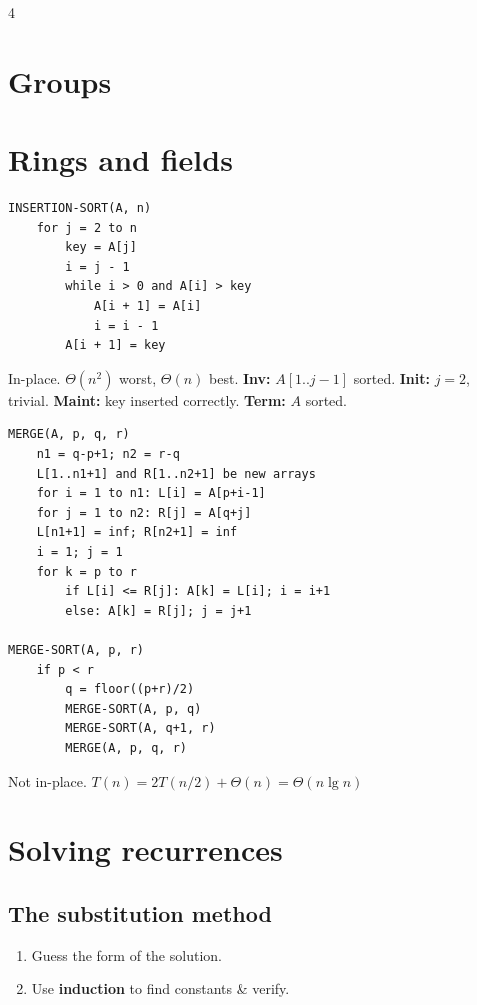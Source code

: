 \documentclass[8pt,a4paper,landscape]{extarticle}
\begin{document}
\begin{multicols*}{4}
\section{Groups}

\section{Rings and fields}

\iffalse
\begin{lstlisting}
INSERTION-SORT(A, n)
    for j = 2 to n
        key = A[j]
        i = j - 1
        while i > 0 and A[i] > key
            A[i + 1] = A[i]
            i = i - 1
        A[i + 1] = key
\end{lstlisting}

\begin{prop}[title=Runtime \& Loop invariant (like induction)]
In-place. $\Theta(n^2)$ worst, $\Theta(n)$ best. \textbf{Inv:} $A[1..j{-}1]$ sorted.
\textbf{Init:} $j{=}2$, trivial. \textbf{Maint:} key inserted correctly. \textbf{Term:} $A$ sorted.
\end{prop}

\begin{lstlisting}
MERGE(A, p, q, r)
    n1 = q-p+1; n2 = r-q
    L[1..n1+1] and R[1..n2+1] be new arrays
    for i = 1 to n1: L[i] = A[p+i-1]
    for j = 1 to n2: R[j] = A[q+j]
    L[n1+1] = inf; R[n2+1] = inf
    i = 1; j = 1
    for k = p to r
        if L[i] <= R[j]: A[k] = L[i]; i = i+1
        else: A[k] = R[j]; j = j+1

MERGE-SORT(A, p, r)
    if p < r
        q = floor((p+r)/2)
        MERGE-SORT(A, p, q)
        MERGE-SORT(A, q+1, r)
        MERGE(A, p, q, r)
\end{lstlisting}

\begin{prop}[title=Runtime]
Not in-place. $T(n)=2T(n/2)+\Theta(n)=\Theta(n\lg n)$
\end{prop}

\section{Solving recurrences}

\subsection{The substitution method}
\begin{enumerate}
  \item Guess the form of the solution.
  \item Use \textbf{induction} to find constants \& verify.
\end{enumerate}


\end{multicols*}
\end{document}
